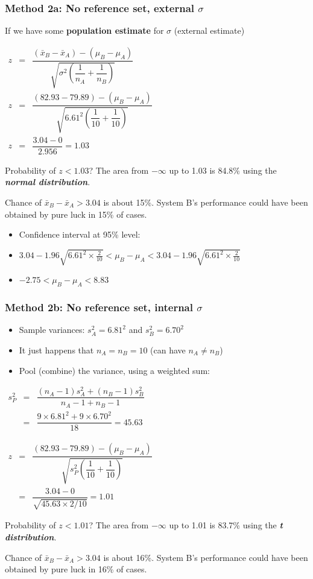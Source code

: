 \begin{frame}\frametitle{Method 2a: No reference set, external $\sigma$}

	If we have some \textbf{population estimate} for $\sigma$ (external estimate)

	$
	\begin{array}{rcl}
		z &=& \dfrac{(\bar{x}_B - \bar{x}_A) - (\mu_B - \mu_A)}{\sqrt{\sigma^2 \left( \dfrac{1}{n_A} + \dfrac{1}{n_B}\right)}} \\
		z &=& \dfrac{(82.93-79.89) - (\mu_B - \mu_A)}{\sqrt{6.61^2 \left( \dfrac{1}{10} + \dfrac{1}{10}\right)}} \\
		z &=& \dfrac{3.04 - 0}{2.956} = 1.03
	\end{array}
	$

	Probability of $z < 1.03$? The area from $-\infty$ up to 1.03 is 84.8\% using the \textbf{\emph{normal distribution}}.

	Chance of $\bar{x}_B - \bar{x}_A > 3.04$ is about 15\%. System B's performance could have been obtained by pure luck in 15\% of cases.
	\begin{itemize}
		\item	Confidence interval at 95\% level:
		\item$3.04 - 1.96 \sqrt{6.61^2 \times \frac{2}{10}} < \mu_B - \mu_A < 3.04 - 1.96 \sqrt{6.61^2 \times \frac{2}{10}}$
		\item$-2.75 < \mu_B - \mu_A < 8.83$
	\end{itemize}
\end{frame}

\begin{frame}\frametitle{Method 2b: No reference set, internal $\sigma$}
	\begin{itemize}
		\item	Sample variances: $s_A^2 = 6.81^2$ and $s_B^2 = 6.70^2$
		\item	It just happens that $n_A = n_B = 10$ (can have $n_A \neq n_B$)
		\item	Pool (combine) the variance, using a weighted sum:
	\end{itemize}

	$
	\begin{array}{rcccl}
		s_P^2 &=& \dfrac{(n_A -1) s_A^2 + (n_B-1)s_B^2}{n_A - 1 + n_B - 1} \\
		&=& \dfrac{9\times 6.81^2 + 9 \times 6.70^2}{18} = 45.63
	\end{array}
	$

	$
	\begin{array}{rcccl}
		z &=& \dfrac{(82.93 - 79.89) - (\mu_B - \mu_A)}{\sqrt{s_P^2 \left(\dfrac{1}{10} + \dfrac{1}{10}\right)}} \\
		&=& \dfrac{3.04 - 0}{\sqrt{45.63 \times 2/10}} = 1.01
	\end{array}
	$

	Probability of $z < 1.01$? The area from $-\infty$ up to 1.01 is 83.7\% using the \textbf{\emph{t distribution}}.

	Chance of $\bar{x}_B - \bar{x}_A > 3.04$ is about 16\%. System B's performance could have been obtained by pure luck in 16\% of cases.
\end{frame}

